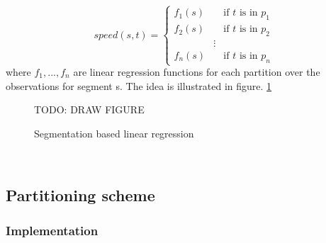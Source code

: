 \[ speed(s,t) =
  \begin{cases}
    f_1(s)       & \quad \text{if } t \text{ is in } p_1\\
    f_2(s)  & \quad \text{if } t \text{ is in } p_2\\
    &\vdots\\
    f_n(s) & \quad \text{if } t \text{ is in } p_n
  \end{cases}
\]
where $f_1,...,f_n$ are linear regression functions for each partition over the observations for segment s. The idea is illustrated in figure. \ref{fig:segmented-regression}
\begin{figure}\label{fig:segmented-regression}
\centering
TODO: DRAW FIGURE
\caption{Segmentation based linear regression}
\end{figure}
% 
\\
\subsection{Partitioning scheme}\label{patterns:segmentation}


\subsubsection{Implementation}\label{patterns:weka}

